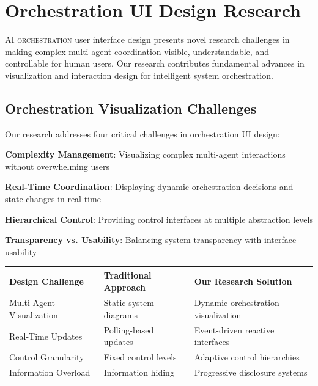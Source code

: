 
\section*{Orchestration UI Design Research}

\lettrine{A}{I orchestration} user interface design presents novel research challenges in making complex multi-agent coordination visible, understandable, and controllable for human users. Our research contributes fundamental advances in visualization and interaction design for intelligent system orchestration.

\subsection*{Orchestration Visualization Challenges}

Our research addresses four critical challenges in orchestration UI design:

\begin{expandedlist}
    \item \textbf{Complexity Management}: Visualizing complex multi-agent interactions without overwhelming users
    \item \textbf{Real-Time Coordination}: Displaying dynamic orchestration decisions and state changes in real-time
    \item \textbf{Hierarchical Control}: Providing control interfaces at multiple abstraction levels
    \item \textbf{Transparency vs. Usability}: Balancing system transparency with interface usability
\end{expandedlist}

\begin{center}
\begin{tabular}{@{}lll@{}}
\toprule
\textbf{Design Challenge} & \textbf{Traditional Approach} & \textbf{Our Research Solution} \\
\midrule
Multi-Agent Visualization & Static system diagrams & Dynamic orchestration visualization \\
Real-Time Updates & Polling-based updates & Event-driven reactive interfaces \\
Control Granularity & Fixed control levels & Adaptive control hierarchies \\
Information Overload & Information hiding & Progressive disclosure systems \\
\bottomrule
\end{tabular}
\end{center}

